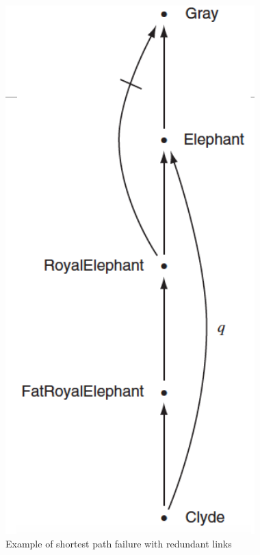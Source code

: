 \begin{figure}
	\includegraphics[width=\textwidth]{Images/shortestError}
	\caption{Example of shortest path failure with redundant links}
	\label{img:shortest}
\end{figure}


